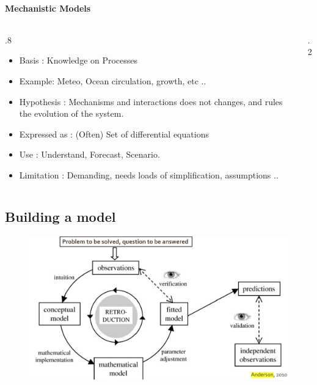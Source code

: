 \documentclass[final,xcolor=dvipsnames]{beamer}
\begin{document}
      \begin{frame}
	\framesubtitle{Mechanistic Models}
	\begin{columns}
	  \begin{column}{.8\framewidth}
	    \begin{itemize}
	      \item Basis : Knowledge on Processes
	      \item Example: Meteo, Ocean circulation, growth, etc ..
	      \item Hypothesis : Mechanisms and interactions does not changes, and rules the evolution of the system. 
	      \item Expressed as : (Often) Set of differential equations
	      \item Use : Understand, Forecast, Scenario.
	      \item Limitation : Demanding, needs loads of simplification, assumptions .. 
	    \end{itemize}
	  \end{column}
	  \begin{column}{.2\framewidth}
	  \end{column}
	\end{columns}
      \end{frame}
      
      
      \subsection{Building a model}
      \begin{frame}
	\begin{figure}
	  \includegraphics[width=.95\columnwidth]{ModellingSteps}
	\end{figure}
      \end{frame}
      
\end{document}

